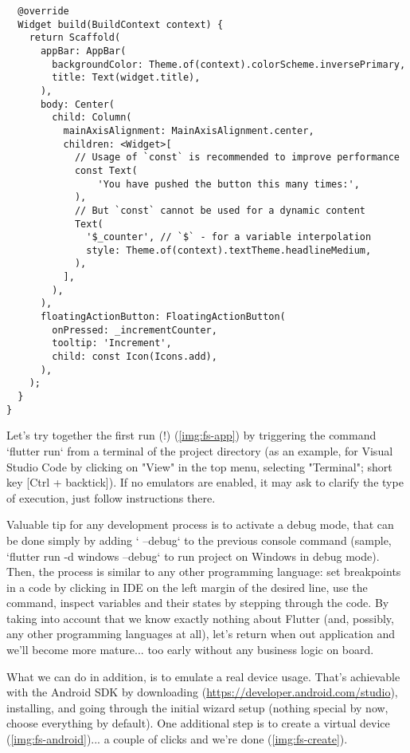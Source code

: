 \begin{lstlisting}
  @override
  Widget build(BuildContext context) {
    return Scaffold(
      appBar: AppBar(
        backgroundColor: Theme.of(context).colorScheme.inversePrimary,
        title: Text(widget.title),
      ),
      body: Center(
        child: Column(
          mainAxisAlignment: MainAxisAlignment.center,
          children: <Widget>[
            // Usage of `const` is recommended to improve performance
            const Text(
                'You have pushed the button this many times:',
            ),
            // But `const` cannot be used for a dynamic content
            Text(
              '$_counter', // `$` - for a variable interpolation
              style: Theme.of(context).textTheme.headlineMedium,
            ),
          ],
        ),
      ),
      floatingActionButton: FloatingActionButton(
        onPressed: _incrementCounter,
        tooltip: 'Increment',
        child: const Icon(Icons.add),
      ),
    );
  }
}
\end{lstlisting}

Let's try together the first run (!) (\cref{img:fs-app}) by triggering the command `flutter run` from a terminal of the 
project directory (as an example, for Visual Studio Code by clicking on "View" in the top menu, selecting "Terminal"; 
short key [Ctrl + backtick]). If no emulators are enabled, it may ask to clarify the type of execution, just follow 
instructions there.

Valuable tip for any development process is to activate a debug mode, that can be done simply by adding ` --debug` to 
the previous console command (sample, `flutter run -d windows --debug` to run project on Windows in debug mode). Then, 
the process is similar to any other programming language: set breakpoints in a code by clicking in IDE on the left 
margin of the desired line, use the command, inspect variables and their states by stepping through the code. 
By taking into account that we know exactly nothing about Flutter (and, possibly, any other programming languages 
at all), let's return when out application and we'll become more mature... too early without any business logic on board.


What we can do in addition, is to emulate a real device usage. That's achievable with the Android SDK by downloading 
(\href{https://developer.android.com/studio}{https://developer.android.com/studio}), installing, and going through 
the initial wizard setup (nothing special by now, choose everything by default). One additional step is to create a 
virtual device (\cref{img:fs-android})... a couple of clicks and we're done (\cref{img:fs-create}).

